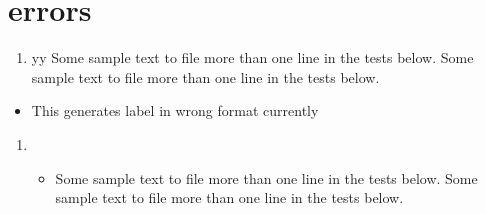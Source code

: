 \documentclass{article}
\newcommand\text{Some sample text to file more than one line in the tests
  below. Some sample text to file more than one line in the tests
  below. }
\begin{document}
\section{errors}

\scrollmode


\begin{enumerate}
\end{enumerate}

\begin{enumerate}
\text
\item yy \text
\end{enumerate}

\begin{enumerate}
\begin{itemize}
  \item This generates label in wrong format currently
\end{itemize}
\end{enumerate}

\begin{enumerate}
\item \begin{itemize}
  \item \text
\end{itemize}
\end{enumerate}

\item
\end{document}
